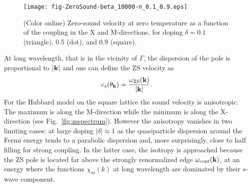\documentclass[showpacs,amsmath,twocolumn,floatfix]{revtex4-1}
\begin{document}
\begin{figure}[b]
  \texttt{[image: fig-ZeroSound-beta\_10000-n\_0.1\_0.9.eps]}
  \caption{(Color online) Zero-sound velocity  at zero temperature as a function of 
  the coupling in the X and M-directions, for doping $\delta=0.1$ (triangle), 0.5 (dot), 
  and 0.9 (square). }
  \label{fig:zsvelocity}
\end{figure}

At long wavelength, that is in the vicinity of $\Gamma$, the dispersion of the 
pole is proportional to $|{\bf k}|$ and one can define the ZS velocity as 
\begin{equation}
c_s(\theta_{\bf k}) = \frac{\omega_{\rm ZS}({\bf k})}{|{\bf k}|}. 
\end{equation}
For the Hubbard model on the square lattice the sound velocity is anisotropic. The 
maximum is along the M-direction while the minimum is along the X-direction (see 
Fig.~\ref{fig:zsspectrum}). However the anisotropy vanishes in two limiting cases: 
at large doping $|\delta| \approx 1$ as the quasiparticle dispersion around the 
Fermi energy tends to a parabolic dispersion and, more surprisingly, close to half 
filling for strong coupling. In the latter case, the isotropy is approached because 
the ZS pole is located far above the strongly renormalized edge
$\omega_{\rm cont}({\bf k})$, at an energy where the functions $\chi_m(k)$ at long 
wavelength are dominated by their $s$-wave component. 
\end{document}
